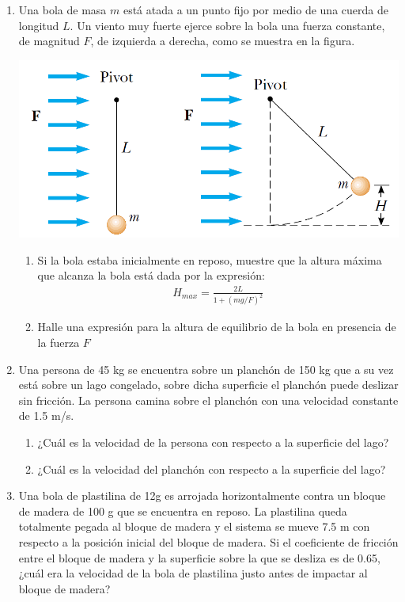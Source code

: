 \documentclass[letterpaper,10pt,onecolumn]{article}
\begin{document}
\begin{enumerate}
\begin{enumerate}
\begin{figure}[h]
\begin{center}
\end{center} 
\end{figure}
\end{enumerate}
\item Una bola de masa $m$ está atada a un punto fijo por medio de una cuerda de longitud $L$. Un viento muy fuerte ejerce sobre la bola una fuerza constante, de magnitud $F$, de izquierda a derecha, como se muestra en la figura.
\begin{center} 
\includegraphics[scale=0.5]{bolaviento} 
\end{center} 
\begin{enumerate}
\item Si la bola estaba inicialmente en reposo, muestre que la altura máxima que alcanza la bola está dada por la expresión:
\begin{align}
H_{max}=\frac{2L}{1+(mg/F)^2}
\end{align}
\item Halle una expresión para la altura de equilibrio de la bola en presencia de la fuerza $F$
\end{enumerate} %
\item Una persona de 45 kg se encuentra sobre un planchón de 150 kg que a su vez está sobre un lago congelado, sobre dicha superficie el planchón puede deslizar sin fricción. La persona camina sobre el planchón con una velocidad constante de 1.5 m/s.
\begin{enumerate}
\item ¿Cuál es la velocidad de la persona con respecto a la superficie del lago?
\item ¿Cuál es la velocidad del planchón con respecto a la superficie del lago?
\end{enumerate} %
\item Una bola de plastilina de 12g es arrojada horizontalmente contra un bloque de madera de 100 g que se encuentra en reposo. La plastilina queda totalmente pegada al bloque de madera y el sistema se mueve 7.5 m con respecto a la posición inicial del bloque de madera. Si el coeficiente de fricción entre el bloque de madera y la superficie sobre la que se desliza es de 0.65, ¿cuál era la velocidad de la bola de plastilina justo antes de impactar al bloque de madera? %

\end{enumerate}
 
\end{document}
